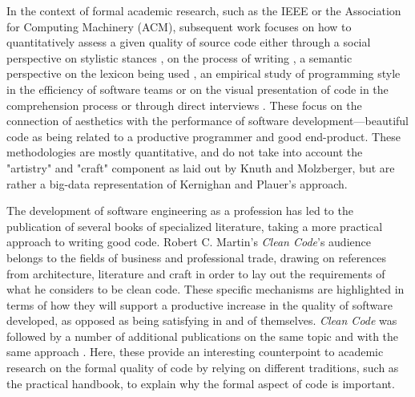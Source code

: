 In the context of formal academic research, such as the IEEE or the Association for Computing Machinery (ACM), subsequent work focuses on how to quantitatively assess a given quality of source code either through a social perspective on stylistic stances \citep{oman_taxonomy_1990}, on the process of writing \citep{norick_effects_2010}, a semantic perspective on the lexicon being used \citep{fakhoury_improving_2019,guerrouj_normalizing_2013}, an empirical study of programming style in the efficiency of software teams \citep{reed_sometimes_2010,coleman_aesthetics_2018} or on the visual presentation of code in the comprehension process \citep{marcus_graphic_1982} or through direct interviews \citep{hermans_role_2020}. These focus on the connection of aesthetics with the performance of software development—beautiful code as being related to a productive programmer and good end-product. These methodologies are mostly quantitative, and do not take into account the "artistry" and "craft" component as laid out by Knuth and Molzberger, but are rather a big-data representation of Kernighan and Plauer's approach.

The development of software engineering as a profession has led to the publication of several books of specialized literature, taking a more practical approach to writing good code. Robert C. Martin's \emph{Clean Code}'s audience belongs to the fields of business and professional trade, drawing on references from architecture, literature and craft in order to lay out the requirements of what he considers to be clean code. These specific mechanisms are highlighted in terms of how they will support a productive increase in the quality of software developed, as opposed as being satisfying in and of themselves. \emph{Clean Code} was followed by a number of additional publications on the same topic and with the same approach \citep{fowler_refactoring_1999,arns_code_2005,hunt_pragmatic_1999}. Here, these provide an interesting counterpoint to academic research on the formal quality of code by relying on different traditions, such as the practical handbook, to explain why the formal aspect of code is important.


